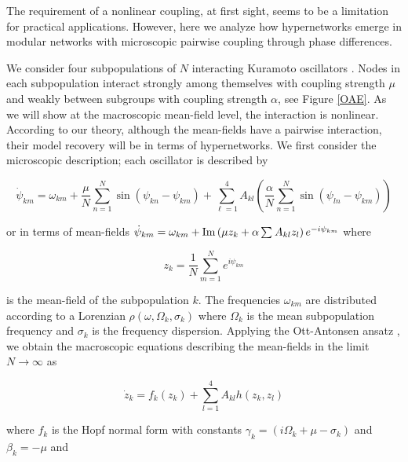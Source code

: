 \documentclass[12pt]{article}
\theoremstyle{plain}
\theoremstyle{definition}
\theoremstyle{remark}
\theoremstyle{remark}
\begin{document}
{\color{black} The requirement of a nonlinear coupling, at first sight, seems to be a limitation for practical applications. However, here we analyze how  hypernetworks emerge in modular networks with microscopic pairwise coupling through phase differences.

We consider four subpopulations of $N$ interacting Kuramoto oscillators \cite{Stankovski_RMP_2017}. Nodes in each subpopulation interact strongly among themselves with coupling strength $\mu$ and weakly between subgroups with coupling strength $\alpha$, see Figure \ref{OAE}. As we will show at the macroscopic mean-field level, the interaction is nonlinear. According to our theory, although the mean-fields have a pairwise interaction, their model recovery will be in terms of hypernetworks. We first consider the microscopic description; each oscillator is described by 
\begin{linenomath}
\begin{equation}
\dot{\psi}_{km} = \omega_{km} + \frac{\mu}{N}\sum_{n=1}^N\sin(\psi_{kn} - \psi_{km}) +  \sum_{\ell=1}^4 A_{kl} \left( \frac{\alpha}{N} \sum_{n=1}^N\sin( \psi_{ln} - \psi_{km}) \right)
\end{equation}
\end{linenomath}
or in terms of mean-fields
$
\dot{\psi}_{km} = \omega_{km} + {\rm Im} \left( \mu  z_{k}  + \alpha  \sum_{} A_{kl} z_{l}  \right) e^{-i \psi_{km}}
$
where
\begin{linenomath}
\begin{equation}
z_k = \frac{1}{N}\sum_{m=1}^N e^{i \psi_{km}}
\end{equation}
\end{linenomath}
is the mean-field of the subpopulation $k$.  The frequencies $\omega_{km}$ are distributed according to a Lorenzian $\rho(\omega,\Omega_k,\sigma_k)$  where $\Omega_k$ is the mean subpopulation frequency and $\sigma_k$ is the frequency dispersion.  Applying the Ott-Antonsen ansatz \cite{RalfNC}, we obtain the macroscopic equations describing the mean-fields in the limit $N\rightarrow \infty$ as 
\begin{linenomath}
\begin{equation}
\dot{z}_k = f_k(z_k) + \sum_{l=1}^4 A_{kl} h(z_k,z_l) 
\end{equation}
\end{linenomath}
where $f_k$ is the Hopf normal form with constants $\gamma_k = (i \Omega_k +\mu - \sigma_k)$ and $\beta_k = -\mu$ and 
\begin{linenomath}
\begin{equation}

\end{equation}
\end{linenomath}}
\end{document}
